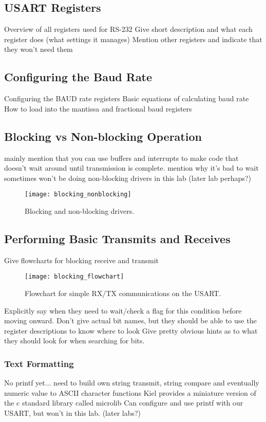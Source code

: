 \documentclass[11pt,fleqn]{book} %
\begin{document}
\subsection{USART Registers}	
Overview of all registers used for RS-232
Give short description and what each register does (what settings it manages)
Mention other registers and indicate that they won't need them
\subsection{Configuring the Baud Rate}	
Configuring the BAUD rate registers
Basic equations of calculating baud rate
How to load into the mantissa and fractional baud registers
\subsection{Blocking vs Non-blocking Operation}
mainly mention that you can use buffers and interrupts to make code that doesn't wait around until transmission is complete. 
mention why it's bad to wait sometimes
won't be doing non-blocking drivers in this lab (later lab perhaps?)
\begin{figure}[]
    \centering\texttt{[image: blocking\_nonblocking]}
    \caption{Blocking and non-blocking drivers.}
    \label{blocking_nonblocking}
\end{figure}
\subsection{Performing Basic Transmits and Receives}
Give flowcharts for blocking receive and transmit
\begin{figure}[]
    \centering\texttt{[image: blocking\_flowchart]}
    \caption{Flowchart for simple RX/TX communications on the USART.}
    \label{blocking_flowchart}
\end{figure}
Explicitly say when they need to wait/check a flag for this condition before moving onward. 
Don't give actual bit names, but they should be able to use the register descriptions to know where to look
Give pretty obvious hints as to what they should look for when searching for bits.
\subsubsection{Text Formatting}
No printf yet... need to build own string transmit, string compare and eventually numeric value to ASCII character functions
Kiel provides a miniature version of the c standard library called microlib
Can configure and use printf with our USART, but won't in this lab. (later labs?)
\end{document}
